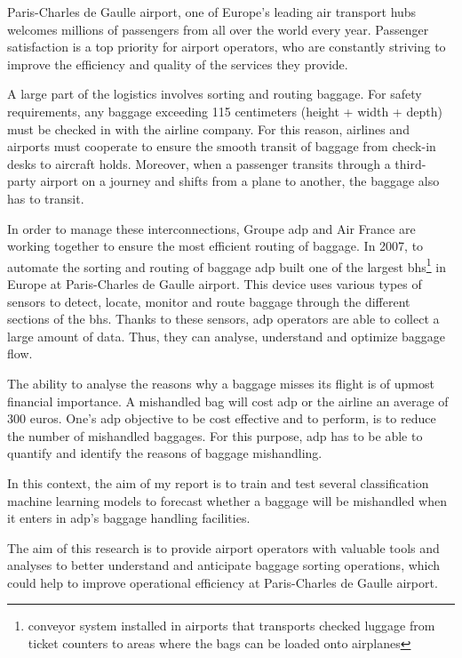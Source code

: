 \documentclass[12pt]{article}
\begin{document}
Paris-Charles de Gaulle airport, one of Europe's leading air transport hubs welcomes millions of passengers from all over the world every year. Passenger satisfaction is a top priority for airport operators, who are constantly striving to improve the efficiency and quality of the services they provide.  \hfill \break


A large part of the logistics involves sorting and routing baggage. For safety requirements, any baggage exceeding 115 centimeters (height + width + depth) must be checked in with the airline company. For this reason, airlines and airports must cooperate to ensure the smooth transit of baggage from check-in desks to aircraft holds. Moreover, when a passenger transits through a third-party airport on a journey and shifts from a plane to another, the baggage also has to transit. \hfill \break


In order to manage these interconnections, Groupe \acrshort{adp} and Air France are working together to ensure the most efficient routing of baggage. In 2007, to automate the sorting and routing of baggage  \acrshort{adp}  built one of the largest \acrfull{bhs}\footnote{conveyor system installed in airports that transports checked luggage from ticket counters to areas where the bags can be loaded onto airplanes} in Europe at Paris-Charles de Gaulle airport. This device uses various types of sensors to detect, locate, monitor and route baggage through the different sections of the \acrshort{bhs}. Thanks to these sensors, \acrshort{adp} operators are able to collect a large amount of data. Thus, they can analyse, understand and optimize baggage flow.  \hfill \break

The ability to analyse the reasons why a baggage misses its flight is of upmost financial importance. A mishandled bag will cost \acrshort{adp} or the airline an average of 300 euros. One's \acrshort{adp} objective to be cost effective and to perform, is to reduce the number of mishandled baggages. For this purpose, \acrshort{adp} has to be able to quantify and identify the reasons of baggage mishandling. \hfill \break

In this context, the aim of my report is to train and test several classification machine learning models to forecast whether a baggage will be mishandled when it enters in \acrshort{adp}'s baggage handling facilities.\hfill \break 


The aim of this research is to provide airport operators with valuable tools and analyses to better understand and anticipate baggage sorting operations, which could help to improve operational efficiency at Paris-Charles de Gaulle airport. \hfill \break
\end{document}
